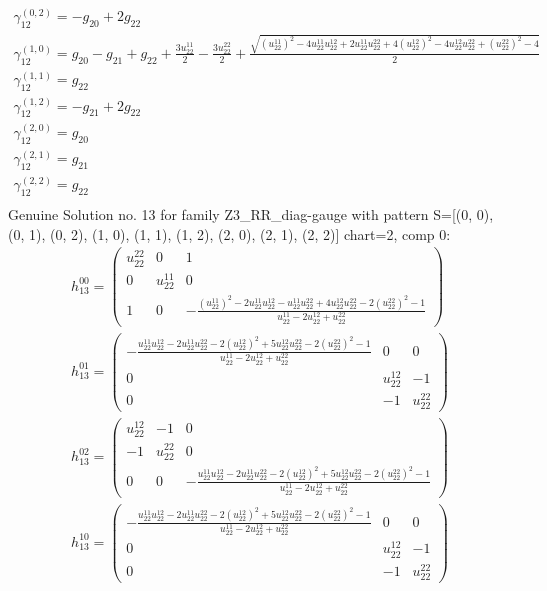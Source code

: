 \documentclass[a4paper, 11pt, twoside, onecolumn]{article}
\begin{document}
\begin{landscape}
\begin{gather*}
	 \gamma^{(0, 2)}_12=- g_{20} + 2 g_{22}\\ 
	 \gamma^{(1, 0)}_12=g_{20} - g_{21} + g_{22} + \frac{3 u^{11}_{22}}{2} - \frac{3 u^{22}_{22}}{2} + \frac{\sqrt{\left(u^{11}_{22}\right)^{2} - 4 u^{11}_{22} u^{12}_{22} + 2 u^{11}_{22} u^{22}_{22} + 4 \left(u^{12}_{22}\right)^{2} - 4 u^{12}_{22} u^{22}_{22} + \left(u^{22}_{22}\right)^{2} - 4}}{2}\\ 
	 \gamma^{(1, 1)}_12=g_{22}\\ 
	 \gamma^{(1, 2)}_12=- g_{21} + 2 g_{22}\\ 
	 \gamma^{(2, 0)}_12=g_{20}\\ 
	 \gamma^{(2, 1)}_12=g_{21}\\ 
	 \gamma^{(2, 2)}_12=g_{22}\\ 
\end{gather*} 
Genuine Solution no. 13 for family Z3_RR_diag-gauge with pattern S=[(0, 0), (0, 1), (0, 2), (1, 0), (1, 1), (1, 2), (2, 0), (2, 1), (2, 2)] chart=2, comp 0: 
\begin{gather*} 
	 h_13^{00}=\begin{pmatrix}u^{22}_{22} & 0 & 1\\0 & u^{11}_{22} & 0\\1 & 0 & - \frac{\left(u^{11}_{22}\right)^{2} - 2 u^{11}_{22} u^{12}_{22} - u^{11}_{22} u^{22}_{22} + 4 u^{12}_{22} u^{22}_{22} - 2 \left(u^{22}_{22}\right)^{2} - 1}{u^{11}_{22} - 2 u^{12}_{22} + u^{22}_{22}}\end{pmatrix}\\ 
	 h_13^{01}=\begin{pmatrix}- \frac{u^{11}_{22} u^{12}_{22} - 2 u^{11}_{22} u^{22}_{22} - 2 \left(u^{12}_{22}\right)^{2} + 5 u^{12}_{22} u^{22}_{22} - 2 \left(u^{22}_{22}\right)^{2} - 1}{u^{11}_{22} - 2 u^{12}_{22} + u^{22}_{22}} & 0 & 0\\0 & u^{12}_{22} & -1\\0 & -1 & u^{22}_{22}\end{pmatrix}\\ 
	 h_13^{02}=\begin{pmatrix}u^{12}_{22} & -1 & 0\\-1 & u^{22}_{22} & 0\\0 & 0 & - \frac{u^{11}_{22} u^{12}_{22} - 2 u^{11}_{22} u^{22}_{22} - 2 \left(u^{12}_{22}\right)^{2} + 5 u^{12}_{22} u^{22}_{22} - 2 \left(u^{22}_{22}\right)^{2} - 1}{u^{11}_{22} - 2 u^{12}_{22} + u^{22}_{22}}\end{pmatrix}\\ 
	 h_13^{10}=\begin{pmatrix}- \frac{u^{11}_{22} u^{12}_{22} - 2 u^{11}_{22} u^{22}_{22} - 2 \left(u^{12}_{22}\right)^{2} + 5 u^{12}_{22} u^{22}_{22} - 2 \left(u^{22}_{22}\right)^{2} - 1}{u^{11}_{22} - 2 u^{12}_{22} + u^{22}_{22}} & 0 & 0\\0 & u^{12}_{22} & -1\\0 & -1 & u^{22}_{22}\end{pmatrix}\\ 

\end{gather*}
\end{landscape}
\end{document}
